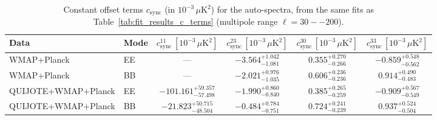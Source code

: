 \begin{table}[t]
\centering
\scriptsize
\setlength{\tabcolsep}{4pt}
\caption{Constant offset terms $c_{\mathrm{sync}}$ (in $10^{-3}\,\mu\mathrm{K}^2$) for the auto-spectra, from the same fits as Table~\ref{tab:fit_results_c_terms} (multipole range $\ell=30--200$).}
\label{tab:fit_results_c_terms_c_terms}
\begin{tabular}{llcccc}
\toprule
Data & Mode & $c_{\mathrm{sync}}^{11}\,[10^{-3}\,\mu\mathrm{K}^2]$ & $c_{\mathrm{sync}}^{23}\,[10^{-3}\,\mu\mathrm{K}^2]$ & $c_{\mathrm{sync}}^{30}\,[10^{-3}\,\mu\mathrm{K}^2]$ & $c_{\mathrm{sync}}^{33}\,[10^{-3}\,\mu\mathrm{K}^2]$ \\
\midrule
WMAP+Planck & EE & --- & $-3.564^{+1.042}_{-1.081}$ & $0.355^{+0.270}_{-0.266}$ & $-0.859^{+0.548}_{-0.562}$ \\
WMAP+Planck & BB & --- & $-2.021^{+0.976}_{-1.035}$ & $0.606^{+0.236}_{-0.236}$ & $0.914^{+0.490}_{-0.483}$ \\
QUIJOTE+WMAP+Planck & EE & $-101.161^{+59.357}_{-57.498}$ & $-1.990^{+0.860}_{-0.840}$ & $0.385^{+0.265}_{-0.259}$ & $-0.909^{+0.567}_{-0.549}$ \\
QUIJOTE+WMAP+Planck & BB & $-21.823^{+50.715}_{-48.504}$ & $-0.484^{+0.784}_{-0.751}$ & $0.724^{+0.241}_{-0.239}$ & $0.937^{+0.524}_{-0.504}$ \\
\bottomrule
\end{tabular}
\end{table}